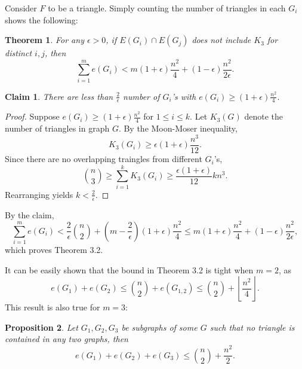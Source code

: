 \documentclass[12pt]{report}
\newtheorem{theorem}{Theorem}[chapter]
\newtheorem{claim}{Claim}
\newtheorem{proposition}[theorem]{Proposition}
\begin{document}
Consider $F$ to be a triangle. Simply counting the number of triangles in each $G_i$ shows the
following:

\begin{theorem}
	For any $\epsilon > 0$, if $E(G_i) \cap E(G_j)$ does not include $K_3$ for distinct $i, j$, then
	\[
		\sum_{i = 1}^m  e(G_i) < m(1 + \epsilon)\frac{n^2}{4} + (1 - \epsilon)\frac{n^2}{2\epsilon}.
	\]
\end{theorem}

\begin{claim}
	There are less than $\frac{2}{\epsilon}$ number of $G_i$'s with $e(G_i) \geq (1 +
	\epsilon)\frac{n^2}{4}$.
\end{claim}

\begin{proof}
	Suppose $e(G_i) \geq (1 + \epsilon)\frac{n^2}{4}$ for $1\leq i \leq k$. Let $K_3(G)$ denote the
	number of triangles in graph $G$. By the Moon-Moser inequality,
	\[
		K_3(G_i) \geq \epsilon(1 + \epsilon)\frac{n^3}{12}.
	\]
	Since there are no overlapping traingles from different $G_i$'s, 
	\[
		\binom{n}{3} \geq \sum_{i = 1}^k K_3(G_i) \geq \frac{\epsilon(1 + \epsilon)}{12}kn^3.
	\]
	Rearranging yields $k < \frac{2}{\epsilon}$.
\end{proof}

By the claim, 
\[
  \sum_{i = 1}^m e(G_i) < \frac{2}{\epsilon}\binom{n}{2} + \left(m - \frac{2}{\epsilon}\right)(1 + \epsilon)\frac{n^2}{4} \leq m(1 + \epsilon)\frac{n^2}{4} + (1 - \epsilon)\frac{n^2}{2\epsilon},
\]
which proves Theorem 3.2.

It can be easily shown that the bound in Theorem 3.2 is tight when $m = 2$, as
\[
	e(G_1) + e(G_2) \leq \binom{n}{2} + e(G_{1, 2}) \leq \binom{n}{2} + \left\lfloor \frac{n^2}{4} \right\rfloor.
\]
This result is also true for $m = 3$:

\begin{proposition}
	Let $G_1, G_2, G_3$ be subgraphs of some $G$ such that no triangle is contained in any two graphs,
	then
	\[
		e(G_1) + e(G_2) + e(G_3) \leq \binom{n}{2} + \frac{n^2}{2}.
	\]
\end{proposition}
\end{document}
